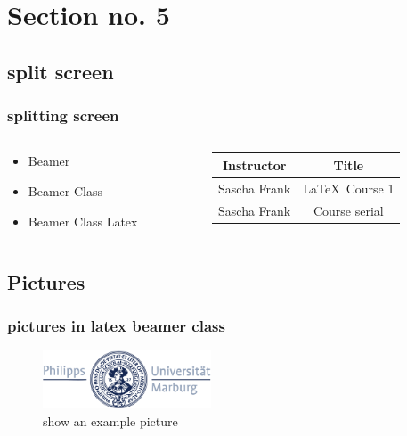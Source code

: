 \documentclass[11pt]{beamer}
\begin{document}
    \section{Section no. 5}
    \subsection{split screen}

    \begin{frame}\frametitle{splitting screen}
        \begin{columns}
            \begin{column}{5cm}
                \begin{itemize}
                    \item Beamer
                    \item Beamer Class
                    \item Beamer Class Latex
                \end{itemize}
            \end{column}
            \begin{column}{5cm}
                \begin{tabular}{|c|c|}
                    \hline
                    \textbf{Instructor} & \textbf{Title} \\
                    \hline
                    Sascha Frank &  \LaTeX \ Course 1 \\
                    \hline
                    Sascha Frank &  Course serial  \\
                    \hline
                \end{tabular}
            \end{column}
        \end{columns}
    \end{frame}

    \subsection{Pictures}
    \begin{frame}\frametitle{pictures in latex beamer class}
        \begin{figure}
            \includegraphics[width=5cm]{gfx/logo_blue}
            \caption{show an example picture}
        \end{figure}
    \end{frame}
\end{document}
